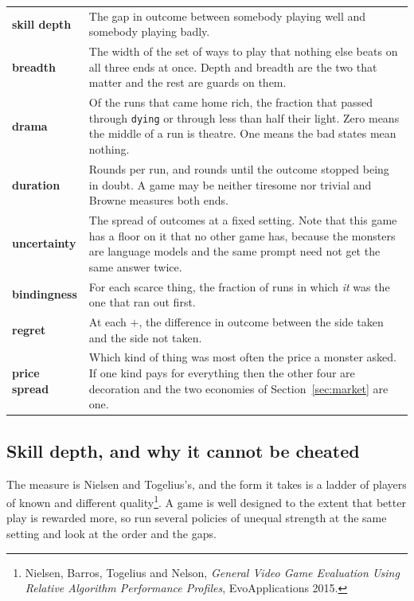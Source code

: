 \documentclass[11pt,a4paper]{article}
\begin{document}
\begin{center}
\begin{tabular}{@{}l@{\hspace{4mm}}>{\raggedright\arraybackslash}p{}@{}}
\toprule
\textbf{skill depth} & The gap in outcome between somebody playing well and somebody playing
badly. \\[1mm]
\textbf{breadth}     & The width of the set of ways to play that nothing else beats on all three
ends at once. Depth and breadth are the two that matter and the rest are guards on them. \\[1mm]
\textbf{drama}       & Of the runs that came home rich, the fraction that passed through
\texttt{dying} or through less than half their light. Zero means the middle of a run is theatre.
One means the bad states mean nothing. \\[1mm]
\textbf{duration}    & Rounds per run, and rounds until the outcome stopped being in doubt. A
game may be neither tiresome nor trivial and Browne measures both ends. \\[1mm]
\textbf{uncertainty} & The spread of outcomes at a fixed setting. Note that this game has a
floor on it that no other game has, because the monsters are language models and the same
prompt need not get the same answer twice. \\[1mm]
\midrule
\textbf{bindingness} & For each scarce thing, the fraction of runs in which \emph{it} was the one
that ran out first. \\[1mm]
\textbf{regret}      & At each $+$, the difference in outcome between the side taken and the
side not taken. \\[1mm]
\textbf{price spread}& Which kind of thing was most often the price a monster asked. If one kind
pays for everything then the other four are decoration and the two economies of
Section~\ref{sec:market} are one. \\
\bottomrule
\end{tabular}
\end{center}

\subsection{Skill depth, and why it cannot be cheated}
\label{sec:depth}

The measure is Nielsen and Togelius's, and the form it takes is a ladder of players of known and
different quality\footnote{Nielsen, Barros, Togelius and Nelson, \emph{General Video Game
Evaluation Using Relative Algorithm Performance Profiles}, EvoApplications 2015.}. A game is
well designed to the extent that better play is rewarded more, so run several policies of
unequal strength at the same setting and look at the order and the gaps.
\end{document}
